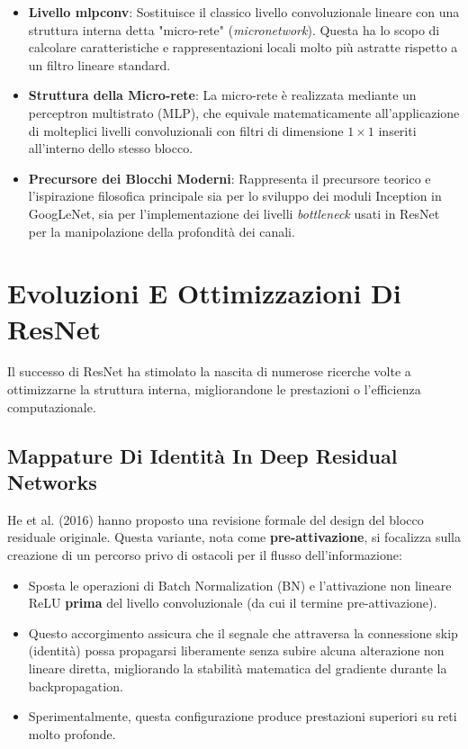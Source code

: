 ﻿\documentclass[11pt, a4paper]{article}
\begin{document}
\begin{itemize}
    \item \textbf{Livello mlpconv}: Sostituisce il classico livello convoluzionale lineare con una struttura interna detta "micro-rete" (\emph{micronetwork}). Questa ha lo scopo di calcolare caratteristiche e rappresentazioni locali molto più astratte rispetto a un filtro lineare standard.
    \item \textbf{Struttura della Micro-rete}: La micro-rete è realizzata mediante un perceptron multistrato (MLP), che equivale matematicamente all'applicazione di molteplici livelli convoluzionali con filtri di dimensione $1 \times 1$ inseriti all'interno dello stesso blocco.
    \item \textbf{Precursore dei Blocchi Moderni}: Rappresenta il precursore teorico e l'ispirazione filosofica principale sia per lo sviluppo dei moduli Inception in GoogLeNet, sia per l'implementazione dei livelli \emph{bottleneck} usati in ResNet per la manipolazione della profondità dei canali.
\end{itemize}


\newpage

\section{Evoluzioni E Ottimizzazioni Di ResNet}

Il successo di ResNet ha stimolato la nascita di numerose ricerche volte a ottimizzarne la struttura interna, migliorandone le prestazioni o l'efficienza computazionale.

\subsection{Mappature Di Identità In Deep Residual Networks}

He et al. (2016) hanno proposto una revisione formale del design del blocco residuale originale. Questa variante, nota come \textbf{pre-attivazione}, si focalizza sulla creazione di un percorso privo di ostacoli per il flusso dell'informazione:

\begin{itemize}
    \item Sposta le operazioni di Batch Normalization (BN) e l'attivazione non lineare ReLU \textbf{prima} del livello convoluzionale (da cui il termine pre-attivazione).
    \item Questo accorgimento assicura che il segnale che attraversa la connessione skip (identità) possa propagarsi liberamente senza subire alcuna alterazione non lineare diretta, migliorando la stabilità matematica del gradiente durante la backpropagation.
    \item Sperimentalmente, questa configurazione produce prestazioni superiori su reti molto profonde.
\end{itemize}
\end{document}
